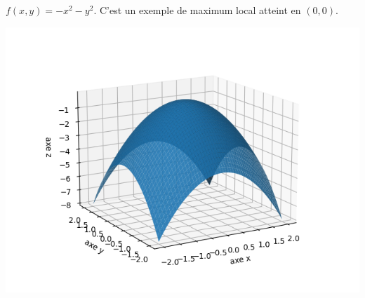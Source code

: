 \documentclass[11pt, class=report,crop=false]{standalone}
\begin{document}
\begin{exemple}
$f(x,y) = -x^2 - y^2$. C'est un exemple de maximum local atteint en $(0,0)$.


\begin{center}
\includegraphics[scale=\myscale,scale=0.5]{figures/fonctions-extrem-2a}
\end{center}

	
\end{exemple}
\end{document}
